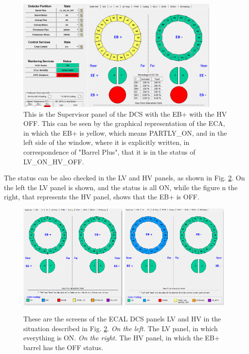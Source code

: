 \documentclass[12pt]{article}
\begin{document}
\begin{figure}[!h]
	\centering
	\includegraphics[width=0.9\textwidth]{Pics/Mainpanel_HVOFF.png}
	\caption{This is the Supervisor panel of the DCS with the EB+ with the HV OFF. This can be seen by the graphical representation of the ECA, in which the EB+ is yellow, which means PARTLY\_ON, and in the left side of the window, where it is explicitly written, in correspondence of "Barrel Plus", that it is in the status of LV\_ON\_HV\_OFF.}
	\label{fig:HVOFF_main}
\end{figure}

The status can be also checked in the LV and HV panels, as shown in Fig. \ref{fig:HVOFF_LVHV}. On the left the LV panel is shown, and the status is all ON, while the figure n the right, that represents the HV panel, shows that the EB+ is OFF.

\begin{figure}[!h]
	\centering
	\includegraphics[width=0.48\textwidth]{Pics/LV_panel.png}
	\quad 
	\includegraphics[width=0.48\textwidth]{Pics/HV_OFF.png}
	\caption{These are the screens of the ECAL DCS panels LV and HV in the situation described in Fig. \ref{fig:HVOFF_LVHV}. \textit{On the left.} The LV panel, in which everything is ON. \textit{On the right.} The HV panel, in which the EB+ barrel has the OFF status. }
	\label{fig:HVOFF_LVHV}
	

\end{figure}
\end{document}
